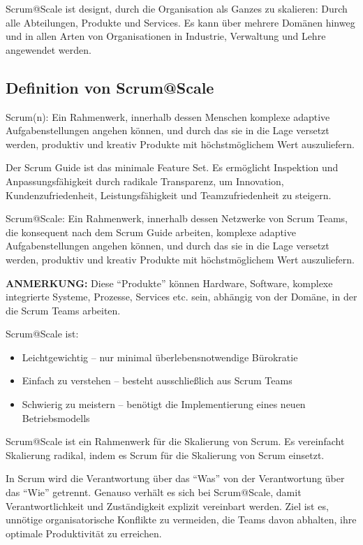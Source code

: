 \documentclass[12pt,a4paper,parskip=full]{scrartcl}
\begin{document}
Scrum@Scale ist designt, durch die Organisation als Ganzes zu skalieren: Durch
alle Abteilungen, Produkte und Services. Es kann über mehrere Domänen hinweg
und in allen Arten von Organisationen in Industrie, Verwaltung und Lehre
angewendet werden.

\subsection{Definition von Scrum@Scale}
Scrum(n): Ein Rahmenwerk, innerhalb dessen Menschen komplexe adaptive
Aufgabenstellungen angehen können, und durch das sie in die Lage versetzt
werden, produktiv und kreativ Produkte mit höchstmöglichem Wert auszuliefern.

Der Scrum Guide ist das minimale Feature Set. Es ermöglicht Inspektion und
Anpassungsfähigkeit durch radikale Transparenz, um Innovation,
Kundenzufriedenheit, Leistungsfähigkeit und Teamzufriedenheit zu steigern.

Scrum@Scale: Ein Rahmenwerk, innerhalb dessen Netzwerke von Scrum Teams, die
konsequent nach dem Scrum Guide arbeiten, komplexe adaptive Aufgabenstellungen
angehen können, und durch das sie in die Lage versetzt werden, produktiv und
kreativ Produkte mit höchstmöglichem Wert auszuliefern.

\textbf{ANMERKUNG:} Diese ``Produkte'' können Hardware, Software, komplexe
integrierte Systeme, Prozesse, Services etc. sein, abhängig von der Domäne,
in der die Scrum Teams arbeiten.

Scrum@Scale ist:
\begin{itemize}
\item Leichtgewichtig – nur minimal überlebensnotwendige Bürokratie
\item Einfach zu verstehen – besteht ausschließlich aus Scrum Teams
\item Schwierig zu meistern – benötigt die Implementierung eines neuen Betriebsmodells
\end{itemize}


Scrum@Scale ist ein Rahmenwerk für die Skalierung von Scrum. Es vereinfacht Skalierung radikal, indem es Scrum für die Skalierung von Scrum einsetzt.

In Scrum wird die Verantwortung über das ``Was'' von der Verantwortung über das
``Wie'' getrennt. Genauso verhält es sich bei Scrum@Scale, damit
Verantwortlichkeit und Zuständigkeit explizit vereinbart werden. Ziel ist es,
unnötige organisatorische Konflikte zu vermeiden, die Teams davon abhalten,
ihre optimale Produktivität zu erreichen.
\end{document}
